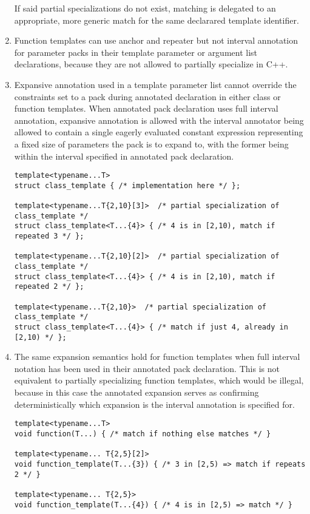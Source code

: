 \documentclass[ notitlepage
              , a4paper
              , twoside ]{article}
\newcommand{\parnum}{\bfseries\arabic{parcount}}
\newcounter{parcount}
\newcommand\p{%
    \stepcounter{parcount}%
    \leavevmode\marginpar[\hfill\parnum]{\parnum}%
}
\begin{document}
\begin{enumerate}
If said partial specializations do not exist, matching is delegated to an appropriate, more generic match for the same declarared template identifier.
\item Function templates can use anchor and repeater but not interval annotation for parameter packs in their template parameter or argument list declarations, because they are not allowed to partially specialize in C++.
\item Expansive annotation used in a template parameter list cannot override the constraints set to a pack during annotated declaration in either class or function templates.
When annotated pack declaration uses full interval annotation, expansive annotation is allowed with the interval annotator being allowed to contain a single eagerly evaluated constant expression representing a fixed size of parameters the pack is to expand to, with the former being within the interval specified in annotated pack declaration.
\begin{verbatim}
template<typename...T>
struct class_template { /* implementation here */ };

template<typename...T{2,10}[3]>  /* partial specialization of class_template */
struct class_template<T...{4}> { /* 4 is in [2,10), match if repeated 3 */ };

template<typename...T{2,10}[2]>  /* partial specialization of class_template */
struct class_template<T...{4}> { /* 4 is in [2,10), match if repeated 2 */ };

template<typename...T{2,10}>  /* partial specialization of class_template */
struct class_template<T...{4}> { /* match if just 4, already in [2,10) */ };
\end{verbatim}
\item \p The same expansion semantics hold for function templates when full interval notation has been used in their annotated pack declaration.
This is not equivalent to partially specializing function templates, which would be illegal, because in this case the annotated expansion serves as confirming deterministically which expansion is the interval
annotation is specified for.
\begin{verbatim}
template<typename...T>
void function(T...) { /* match if nothing else matches */ }

template<typename... T{2,5}[2]>
void function_template(T...{3}) { /* 3 in [2,5) => match if repeats 2 */ }

template<typename... T{2,5}>
void function_template(T...{4}) { /* 4 is in [2,5) => match */ }


\end{verbatim}
\end{enumerate}
\end{document}
